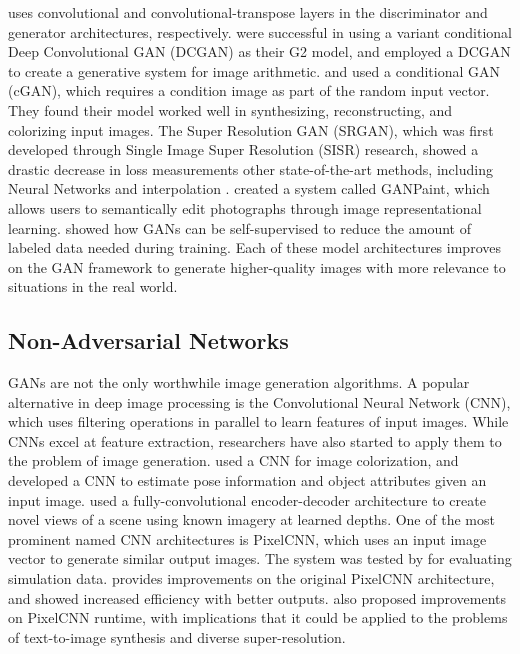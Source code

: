 \documentclass{article}
\begin{document}
\nocite{dcgan}
uses convolutional and convolutional-transpose layers in
the discriminator and generator architectures, respectively.
\cite{pose_guided_image_generation} were successful in using
a variant conditional Deep Convolutional GAN (DCGAN) as their G2 model, and
\cite{unsupervised_learning} employed a DCGAN to
create a generative system for image arithmetic.
\cite{image_to_image} and \cite{deep_video} used a conditional GAN (cGAN),
which requires a condition image as part of the random input vector.
They found their model worked well in
synthesizing, reconstructing, and colorizing input images.
The Super Resolution GAN (SRGAN), which was first developed through
Single Image Super Resolution (SISR) research,
showed a drastic decrease in loss measurements
other state-of-the-art methods, including Neural Networks and interpolation
\cite{srgan}.
\cite{semantic_photo} created a system called GANPaint, which allows users to
semantically edit photographs through image representational learning.
\cite{fewer_labels} showed how GANs can be self-supervised to reduce
the amount of labeled data needed during training.
Each of these model architectures improves on the GAN framework to generate
higher-quality images with more relevance to situations in the real world.

\subsection{Non-Adversarial Networks}
\label{subsec:non_adversarial}
GANs are not the only worthwhile image generation algorithms.
A popular alternative in deep image processing is
the Convolutional Neural Network (CNN), which uses filtering operations
in parallel to learn features of input images.
While CNNs excel at feature extraction, researchers have also started to
apply them to the problem of image generation.
\cite{deep_colorization} used a CNN for image colorization, and
\cite{posecnn} developed a CNN to estimate pose information
and object attributes given an input image.
\cite{multiplane} used a fully-convolutional encoder-decoder architecture to
create novel views of a scene using known imagery at learned depths.
One of the most prominent named CNN architectures is PixelCNN,
which uses an input image vector to generate similar output images.
The system was tested by \cite{comparing_simulations} for evaluating simulation
data. \cite{pixelcnn++} provides improvements on the original
PixelCNN architecture, and showed increased efficiency with better outputs.
\cite{parallel_multiscale} also proposed improvements on PixelCNN runtime,
with implications that it could be applied to the problems of
text-to-image synthesis and diverse super-resolution.
\end{document}
